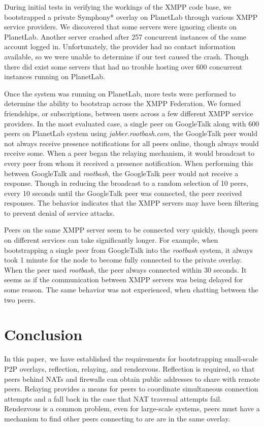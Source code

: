 \documentclass[conference]{IEEEtran}
\begin{document}
During initial tests in verifying the workings of the XMPP code base, we
bootstrapped a  private Symphony* overlay on PlanetLab through various XMPP
service providers.  We discovered that some servers were ignoring clients on
PlanetLab.  Another server crashed after 257 concurrent instances of the same
account logged in.  Unfortunately, the provider had no contact information
available, so we were unable to determine if our test caused the crash.  Though
there did exist some servers that had no trouble hosting over 600 concurrent
instances running on PlanetLab.

Once the system was running on PlanetLab, more tests were performed to
determine the ability to bootstrap across the XMPP Federation.  We formed
friendships, or subscriptions, between users across a few different XMPP
service providers.  In the most evaluated case, a single peer on GoogleTalk
along with 600 peers on PlanetLab system using \textit{jabber.rootbash.com},
the GoogleTalk peer would not always receive presence notifications for all
peers online, though always would receive some.  When a peer began the relaying
mechanism, it would broadcast to every peer from whom it received a presence
notification.  When performing this between GoogleTalk and \textit{rootbash},
the GoogleTalk peer would not receive a response.  Though in reducing the
broadcast to a random selection of 10 peers, every 10 seconds until the
GoogleTalk peer was connected, the peer received responses.  The behavior
indicates that the XMPP servers may have been filtering to prevent denial of
service attacks.

Peers on the same XMPP server seem to be connected very quickly, though peers
on different services can take significantly longer.  For example, when
bootstrapping a single peer from GoogleTalk into the \textit{rootbash} system,
it always took 1 minute for the node to become fully connected to the private
overlay.  When the peer used \textit{rootbash}, the peer always connected
within 30 seconds.  It seems as if the communication between XMPP servers was
being delayed for some reason.  The same behavior was not experienced, when
chatting between the two peers.

\section{Conclusion}
\label{conclusions}

In this paper, we have established the requirements for bootstrapping
small-scale P2P overlays, reflection, relaying, and rendezvous.  Reflection is
required, so that peers behind NATs and firewalls can obtain public addresses
to share with remote peers.  Relaying provides a means for peers to coordinate
simultaneous connection attempts and a fall back in the case that NAT traversal
attempts fail.  Rendezvous is a common problem, even for large-scale systems,
peers must have a mechanism to find other peers connecting to are are in the
same overlay.  
\end{document}
